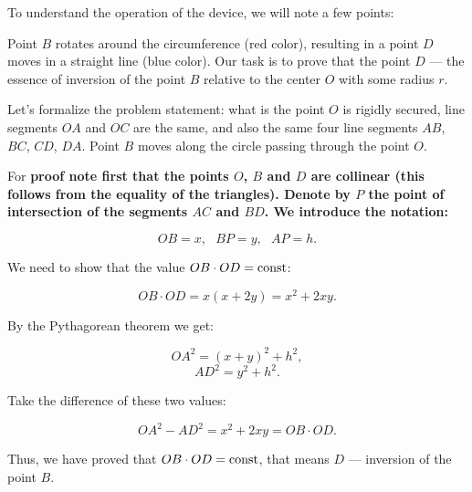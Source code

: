 
To understand the operation of the device, we will note a few points:


Point $B$ rotates around the circumference (red color), resulting in a point $D$ moves in a straight line (blue color). Our task is to prove that the point $D$ --- the essence of inversion of the point $B$ relative to the center $O$ with some radius $r$.

Let's formalize the problem statement: what is the point $O$ is rigidly secured, line segments $OA$ and $OC$ are the same, and also the same four line segments $AB$, $BC$, $CD$, $DA$. Point $B$ moves along the circle passing through the point $O$.

For \bf{proof} note first that the points $O$, $B$ and $D$ are collinear (this follows from the equality of the triangles). Denote by $P$ the point of intersection of the segments $AC$ and $BD$. We introduce the notation:

$$ OB=x,~~~BP=y,~~~AP=h. $$

We need to show that the value $OB \cdot OD = {\rm const}$:

$$ OB \cdot OD = x(x+2y) = x^2 + 2xy. $$

By the Pythagorean theorem we get:

$$ OA^2 = (x+y)^2 + h^2, $$
$$ AD^2 = y^2 + h^2. $$

Take the difference of these two values:

$$ OA^2 - AD^2 = x^2 + 2xy = OB \cdot OD. $$

Thus, we have proved that $OB \cdot OD = {\rm const}$, that means $D$ --- inversion of the point $B$.

